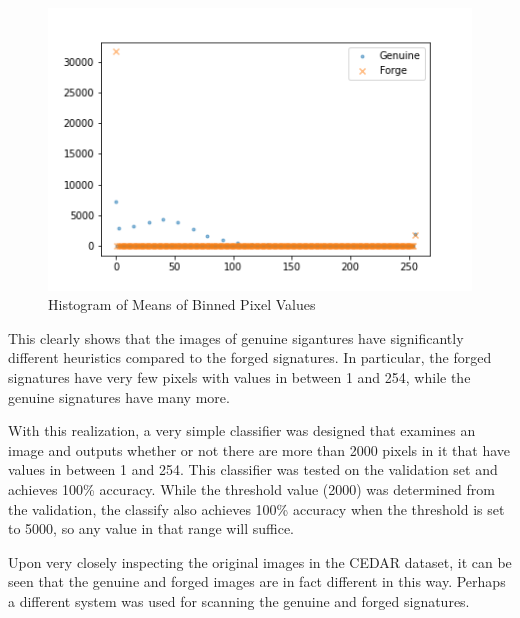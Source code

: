 \begin{figure}[h]
    \begin{center}
        \includegraphics[width=0.8\linewidth]{mean_hist.png}
    \end{center}
    \caption{Histogram of Means of Binned Pixel Values}
    \label{fig:hist_pixel_values}
\end{figure}

This clearly shows that the images of genuine sigantures have significantly different heuristics compared to the forged signatures.
In particular, the forged signatures have very few pixels with values in between 1 and 254, while the genuine signatures have many more.

With this realization, a very simple classifier was designed that examines an image and outputs whether or not there are more than 2000 pixels in it that have values in between 1 and 254.
This classifier was tested on the validation set and achieves 100\% accuracy.
While the threshold value (2000) was determined from the validation, the classify also achieves 100\% accuracy when the threshold is set to 5000, so any value in that range will suffice.

Upon very closely inspecting the original images in the CEDAR dataset, it can be seen that the genuine and forged images are in fact different in this way.
Perhaps a different system was used for scanning the genuine and forged signatures.
